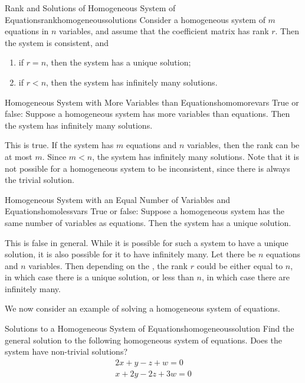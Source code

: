 \begin{theorem}{Rank and Solutions of Homogeneous System of Equations}{rankhomogeneoussolutions}
  Consider a homogeneous system of $m$ equations in $n$ variables, and
  assume that the coefficient matrix has rank $r$. Then the system is
  consistent, and 
\begin{enumerate}
\item if $r=n$, then the system has a unique solution;
\item if $r<n$, then the system has infinitely many solutions.
\end{enumerate}
\end{theorem}

\begin{example}{Homogeneous System with More Variables than Equations}{homomorevars}
  True or false: Suppose a homogeneous system has more variables than
  equations. Then the system has infinitely many solutions.  
\end{example}

\begin{solution}
  This is true. If the system has $m$ equations and $n$ variables,
  then the rank can be at most $m$. Since $m<n$, the system has
  infinitely many solutions. Note that it is not possible for a
  homogeneous system to be inconsistent, since there is always the
  trivial solution.
\end{solution} 

\begin{example}{Homogeneous System with an Equal Number of Variables and Equations}{homolessvars}
  True or false: Suppose a homogeneous system has the same number of
  variables as equations. Then the system has a unique solution.
\end{example}

\begin{solution}
  This is false in general. While it is possible for such a system to
  have a unique solution, it is also possible for it to have
  infinitely many. Let there be $n$ equations and $n$ variables.  Then
  depending on the {\ef}, the rank $r$ could be either equal to $n$,
  in which case there is a unique solution, or less than $n$, in which
  case there are infinitely many.
\end{solution}

We now consider an example of solving a homogeneous system of equations.

\begin{example}{Solutions to a Homogeneous System of Equations}{homogeneoussolution}
Find the general solution to the following homogeneous system of
equations. Does the system have non-trivial solutions?
\begin{equation*}
\begin{array}{c}
2x + y - z + w = 0 \\
x + 2y - 2z + 3w = 0
\end{array}
\end{equation*}
\end{example}

